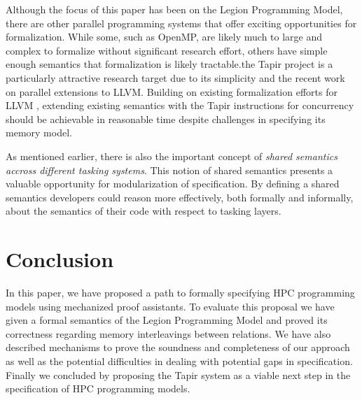 \documentclass[sigconf]{acmart}
\begin{document}
Although the focus of this paper has been on the Legion Programming Model, there are other parallel programming systems
that offer exciting opportunities for formalization. While some, such as
 OpenMP, are likely much to large and complex to formalize without
significant research effort, others have simple enough semantics that formalization is
likely tractable.the Tapir project
\cite{schardl2017tapir} is a particularly attractive research target due to its simplicity
and the recent work on parallel extensions to LLVM. Building on existing formalization efforts for LLVM
\cite{zhao2012formalizing}, extending existing semantics with the Tapir instructions for
concurrency should be achievable in reasonable time despite challenges in
specifying its memory model.

As mentioned earlier, there is also the important concept of \emph{shared
semantics accross different tasking systems}. This notion of shared semantics
presents a valuable opportunity for modularization of specification. By defining
a shared semantics developers could reason more effectively, both formally and
informally, about the semantics of their code with respect to tasking layers.

\section{Conclusion}

In this paper, we have proposed a path to formally specifying HPC programming
models using mechanized proof assistants. To evaluate this proposal we have given a formal
semantics of the Legion Programming Model and proved its correctness regarding
memory interleavings between relations. We have also described mechanisms to
prove the soundness and completeness of our approach as well as the potential
difficulties in dealing with potential gaps in specification. Finally we
concluded by proposing the Tapir system as a viable next step in the
specification of HPC programming models.



\end{document}
